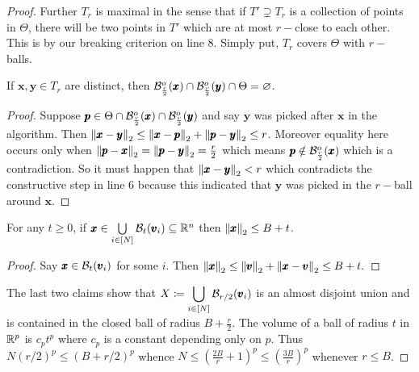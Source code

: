 \begin{proof}
Further $T_{r}$ is maximal in the sense that if $T'\supsetneq T_{r}$ is a collection of points in $\Theta$, there will be two points in $T'$ which are at most $r-$close to each other. This is by our breaking criterion on line $8$. Simply put, $T_{r}$ covers $\Theta$ with $r-$balls.

\begin{cl}\label{disj}
If $\pmb x,\pmb y\in T_{r}$ are distinct, then ${\mathcal{B}}_{\frac{r}{2}}^{o}(\pmb x)\cap {\mathcal{B}}_{\frac{r}{2}}^{o}(\pmb y) \cap \Theta = \varnothing$.
\end{cl}
\begin{proof}
Suppose $\pmb p\in \Theta\cap {\mathcal{B}}_{\frac{r}{2}}^{o}(\pmb x)\cap {\mathcal{B}}_{\frac{r}{2}}^{o}(\pmb y)$ and say $\pmb y$ was picked after $\pmb x$ in the algorithm. Then $\left\lVert \pmb x-\pmb y \right\rVert_{2}\le \left\lVert \pmb x-\pmb p \right\rVert_{2} + \left\lVert \pmb p-\pmb y \right\rVert_{2} \le r$. Moreover equality here occurs only when $\left\lVert \pmb p-\pmb x \right\rVert_{2} = \left\lVert \pmb p-\pmb y \right\rVert_{2}=\frac{r}{2}$ which means $\pmb p\notin {\mathcal{B}}_{\frac r2}^{o}(\pmb x)$ which is a contradiction. So it must happen that $\left\lVert \pmb x-\pmb y \right\rVert_{2}<r$ which contradicts the constructive step in line $6$ because this indicated that $\pmb y$ was picked in the $r-$ball around $\pmb x$.
\end{proof}

\begin{cl}\label{ball}
For any $t\ge 0$, if $\pmb x\in \bigcup\limits_{i\in [N]}{\mathcal{B}}_{t}(\pmb v_{i})\subseteq \mathbb{R}^{n}$ then $\left\lVert \pmb x \right\rVert_{2}\le B+t$.
\end{cl}
\begin{proof}
Say $\pmb x\in {\mathcal{B}}_{t}(\pmb v_{i})$ for some $i$. Then 
$\left\lVert \pmb x \right\rVert_{2} \le \left\lVert \pmb v \right\rVert_{2} + \left\lVert \pmb x-\pmb v \right\rVert_{2} \le B+t.$
\end{proof}

The last two claims show that $\displaystyle X\coloneqq\bigcup\limits_{i\in [N]}{\mathcal{B}}_{r/2}(\pmb v_{i})$ is an almost disjoint union and is contained in the closed ball of radius $B+\frac r2$. The volume of a ball of radius $t$ in $\mathbb{R}^{p}$ is $c_{p}t^{p}$ where $c_{p}$ is a constant depending only on $p$. Thus $N(r/2)^{p} \le (B+r/2)^{p}$ whence $N\le \left(\frac{2B}{r}+1\right)^{p} \le \left(\frac{3B}{r}\right)^{p}$ whenever $r\le B$.
\end{proof}








\nocite{*}
\printbibliography



















